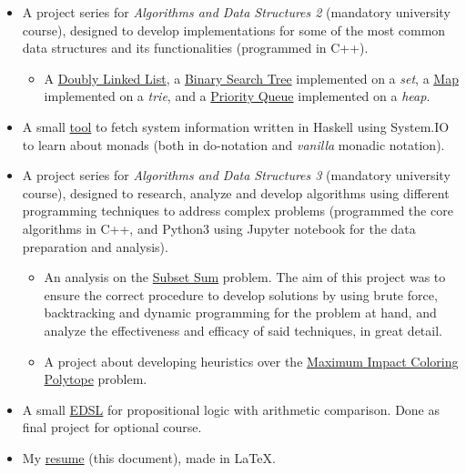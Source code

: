 \documentclass{article}
\begin{document}
\begin{itemize}
    \item A project series for \textit{Algorithms and Data Structures 2} (mandatory university course), designed to develop implementations for some of the most common data structures and its functionalities (programmed in C++).
    \begin{itemize}
        \item A \href{https://github.com/lucasDS-0/Doubly_Linked_List}{Doubly Linked List}, a \href{https://github.com/lucasDS-0/BST_on_a_set}{Binary Search Tree} implemented on a \emph{set}, a \href{https://github.com/lucasDS-0/Map_on_a_trie}{Map} implemented on a \emph{trie}, and a \href{https://github.com/lucasDS-0/Priority_queue_on_a_heap}{Priority Queue} implemented on a \emph{heap}.
    \end{itemize}
    \item A small \href{https://github.com/lucasDS-0/hFetch}{tool} to fetch system information written in Haskell using System.IO to learn about monads (both in do-notation and \emph{vanilla} monadic notation).
    \item A project series for \textit{Algorithms and Data Structures 3} (mandatory university course), designed to research, analyze and develop algorithms using different programming techniques to address complex problems (programmed the core algorithms in C++, and Python3 using Jupyter notebook for the data preparation and analysis).
    \begin{itemize}
        \item An analysis on the \href{https://github.com/lucasDS-0/Subset_sum}{Subset Sum} problem. The aim of this project was to ensure the correct procedure to develop solutions by using brute force, backtracking and dynamic programming for the problem at hand, and analyze the effectiveness and efficacy of said techniques, in great detail.
        \item A project about developing heuristics over the \href{https://github.com/lucasDS-0/MIC_Polytope}{Maximum Impact Coloring Polytope} problem.
    \end{itemize}
    \item A small \href{https://github.com/lucasDS-0/ECI37_N1/tree/main}{EDSL} for propositional logic with arithmetic comparison. Done as final project for  optional course.
    \item My \href{https://github.com/lucasDS-0/Resume}{resume} (this document), made in \LaTeX.
\end{itemize}
\end{document}
